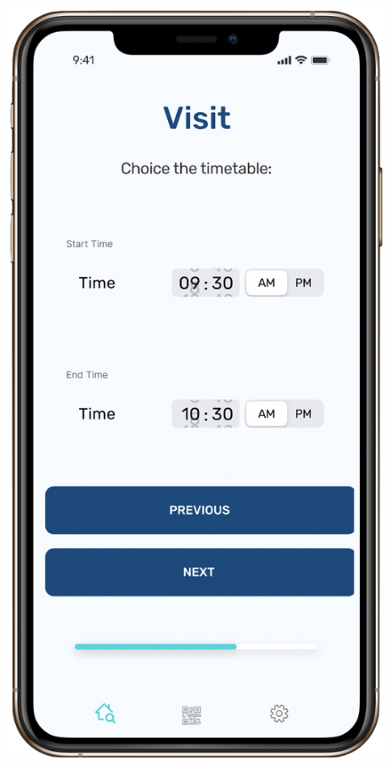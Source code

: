 \begin{figure}[H]
\begin{center}
{            \label{fig:third}
            \includegraphics[scale=0.35]{images/mockup/visit2.png}
        }%
\end{center}
\end{figure}
